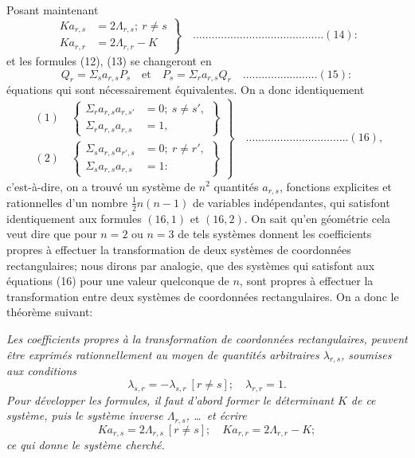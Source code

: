 \documentclass[12pt,a4paper]{article}
\theoremstyle{plain}
\begin{document}
Posant maintenant
\[
\left. \begin{aligned}
K a_{r,s} &= 2\Lambda_{r,s};\ r \neq s \\
K a_{r,r} &= 2\Lambda_{r,r} - K
\end{aligned} \right\} \quad \ldots \ldots \ldots \ldots \ldots \ldots \ldots \ldots \ldots \ldots \ldots \ldots \ldots \ldots (14):
\]
et les formules (12), (13) se changeront en
\[
Q_r = \Sigma_s a_{r,s} P_s \quad \text{et} \quad P_s = \Sigma_r a_{r,s} Q_r \quad \ldots \ldots \ldots \ldots \ldots \ldots \ldots \ldots (15):
\]
\'equations qui sont n\'ecessairement \'equivalentes. On a donc identiquement
\[
\left. \begin{aligned}
(1)\quad \left\{ \begin{aligned} \Sigma_r a_{r,s} a_{r,s'} &= 0;\ s \neq s', \\ \Sigma_r a_{r,s} a_{r,s} &= 1, \end{aligned} \right\} \\[6pt]
(2)\quad \left\{ \begin{aligned} \Sigma_s a_{r,s} a_{r',s} &= 0;\ r \neq r', \\ \Sigma_s a_{r,s} a_{r,s} &= 1: \end{aligned} \right\}
\end{aligned} \right\} \quad \ldots \ldots \ldots \ldots \ldots \ldots \ldots \ldots \ldots \ldots \ldots (16),
\]
c'est-\`a-dire, on a trouv\'e un syst\`eme de $n^2$ quantit\'es $a_{r,s}$, fonctions explicites et rationnelles d'un nombre $\frac{1}{2}n(n-1)$ de variables ind\'ependantes, qui satisfont identiquement aux formules $(16, 1)$ et $(16, 2)$. On sait qu'en g\'eom\'etrie cela veut dire que pour $n = 2$ ou $n = 3$ de tels syst\`emes donnent les coefficients propres \`a effectuer la transformation de deux syst\`emes de coordonn\'ees rectangulaires; nous dirons par analogie, que des syst\`emes qui satisfont aux \'equations (16) pour une valeur quelconque de $n$, sont propres \`a effectuer la transformation entre deux syst\`emes de coordonn\'ees rectangulaires. On a donc le th\'eor\`eme suivant:

\smallskip
\textit{Les coefficients propres \`a la transformation de coordonn\'ees rectangulaires, peuvent \^etre exprim\'es rationnellement au moyen de quantit\'es arbitraires $\lambda_{r,s}$, soumises aux conditions
\[
\lambda_{s,r} = -\lambda_{s,r}\ [r \neq s];\quad \lambda_{r,r} = 1.
\]
Pour d\'evelopper les formules, il faut d'abord former le d\'eterminant $K$ de ce syst\`eme, puis le syst\`eme inverse $\Lambda_{r,s}$, \ldots\ et \'ecrire
\[
K a_{r,s} = 2\Lambda_{r,s}\ [r \neq s];\quad K a_{r,r} = 2\Lambda_{r,r} - K;
\]
ce qui donne le syst\`eme cherch\'e.}
\smallskip
\end{document}
